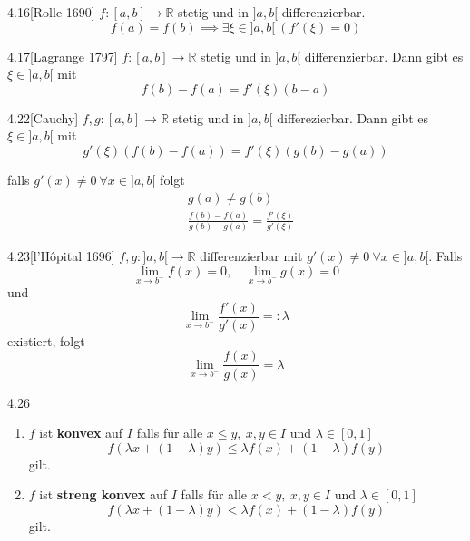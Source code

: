 \documentclass[8pt,a4paper,twocolumn,table]{extarticle}
\newcommand{\R}{\mathbb{R}}
\begin{document}
\begin{satz}{4.16}[Rolle 1690]
    $f: [a, b] \to \R$ stetig und in $]a, b[$ differenzierbar.
            \[ f(a) = f(b) \implies \exists \xi \in ]a, b[\ \left( f'(\xi) = 0 \right) \]
\end{satz}

\begin{satz}{4.17}[Lagrange 1797]
    $f: [a, b] \to \R$ stetig und in $]a, b[$ differenzierbar. Dann gibt es $\xi \in ]a, b[$ mit
    \[ f(b) - f(a) = f'(\xi)(b - a) \]
\end{satz}

\begin{satz}{4.22}[Cauchy]
    $f,g : [a,b] \to \R$ stetig und in $]a, b[$ differezierbar.
                    Dann gibt es $\xi \in ]a, b[$ mit
                    \[ g'(\xi)(f(b) - f(a)) = f'(\xi)(g(b) - g(a)) \]

                    falls $g'(x) \ne 0\ \forall x \in ]a, b[$ folgt
    \begin{align*}
         & g(a) \ne g(b)                                             \\
         & \frac{f(b) - f(a)}{g(b) - g(a)} = \frac{f'(\xi)}{g'(\xi)}
    \end{align*}
\end{satz}

\begin{satz}{4.23}[l'Hôpital 1696]
    $f,g: ]a, b[ \to \R$ differenzierbar mit $g'(x) \ne 0\ \forall x \in ]a, b[$.
    Falls
    \[ \lim_{x \to b^-} f(x) = 0,\quad \lim_{x \to b^-} g(x) = 0 \]
    und
    \[ \lim_{x \to b^-} \frac{f'(x)}{g'(x)} =: \lambda \]
    existiert, folgt
    \[ \lim_{x \to b^-} \frac{f(x)}{g(x)} = \lambda \]
\end{satz}

\begin{definition}{4.26}
    \begin{enumerate}
        \item $f$ ist \textbf{konvex} auf $I$ falls für alle $x \le y,\ x,y \in I$ und $\lambda \in [0,1]$
              \[ f(\lambda x + (1 - \lambda)y) \le \lambda f(x) + (1 - \lambda)f(y) \]
              gilt.
        \item $f$ ist \textbf{streng konvex} auf $I$ falls für alle $x < y,\ x,y \in I$ und $\lambda \in [0,1]$
              \[ f(\lambda x + (1 - \lambda)y) < \lambda f(x) + (1 - \lambda)f(y) \]
              gilt.
    \end{enumerate}
\end{definition}
\end{document}
